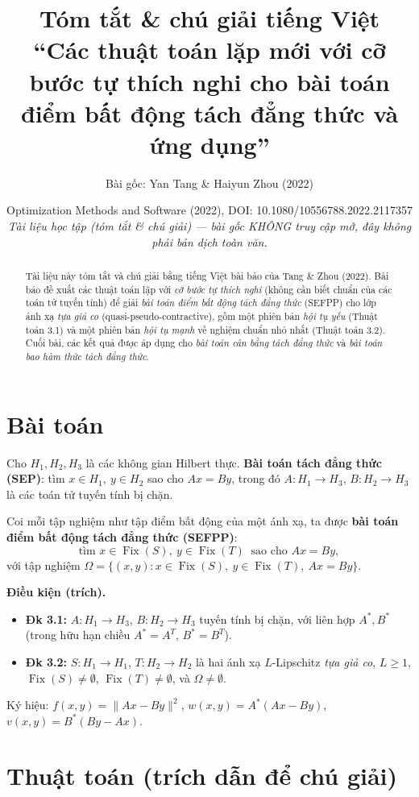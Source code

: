 \documentclass{MyBook}
\title{\vspace{-1.2cm}\bfseries Tóm tắt \& chú giải tiếng Việt\\[4pt]
\large ``Các thuật toán lặp mới với cỡ bước tự thích nghi cho bài toán điểm bất động tách đẳng thức và ứng dụng''}
\author{\normalsize Bài gốc: Yan Tang \& Haiyun Zhou (2022)}
\date{\small Optimization Methods and Software (2022), DOI: 10.1080/10556788.2022.2117357\\[2pt]
\textit{Tài liệu học tập (tóm tắt \& chú giải) --- bài gốc KHÔNG truy cập mở, đây không phải bản dịch toàn văn.}}
\theoremstyle{plain}
\theoremstyle{definition}
\newcommand{\nm}[1]{\lVert #1\rVert}
\newcommand{\Fix}{\operatorname{Fix}}
\begin{document}
\frontmatter
\maketitle

\begin{abstract}
\noindent Tài liệu này tóm tắt và chú giải bằng tiếng Việt bài báo của Tang \& Zhou (2022). Bài báo đề xuất các thuật toán lặp với \emph{cỡ bước tự thích nghi} (không cần biết chuẩn của các toán tử tuyến tính) để giải \emph{bài toán điểm bất động tách đẳng thức} (SEFPP) cho lớp ánh xạ \emph{tựa giả co} (quasi-pseudo-contractive), gồm một phiên bản \emph{hội tụ yếu} (Thuật toán 3.1) và một phiên bản \emph{hội tụ mạnh} về nghiệm chuẩn nhỏ nhất (Thuật toán 3.2). Cuối bài, các kết quả được áp dụng cho \emph{bài toán cân bằng tách đẳng thức} và \emph{bài toán bao hàm thức tách đẳng thức}.
\end{abstract}
\tableofcontents
\mainmatter

\chapter{Bài toán}

Cho $H_1,H_2,H_3$ là các không gian Hilbert thực. \textbf{Bài toán tách đẳng thức (SEP)}: tìm $x\in H_1,\ y\in H_2$ sao cho $Ax=By$, trong đó $A:H_1\to H_3$, $B:H_2\to H_3$ là các toán tử tuyến tính bị chặn.

Coi mỗi tập nghiệm như tập điểm bất động của một ánh xạ, ta được \textbf{bài toán điểm bất động tách đẳng thức (SEFPP)}:
\[
\text{tìm } x\in\Fix(S),\ y\in\Fix(T)\ \text{ sao cho } Ax=By, \tag{6}
\]
với tập nghiệm $\Omega=\{(x,y):x\in\Fix(S),\ y\in\Fix(T),\ Ax=By\}$.

\medskip
\noindent\textbf{Điều kiện (trích).}
\begin{itemize}[leftmargin=1.4em,itemsep=1pt]
\item \textbf{Đk 3.1:} $A:H_1\to H_3$, $B:H_2\to H_3$ tuyến tính bị chặn, với liên hợp $A^{*},B^{*}$ (trong hữu hạn chiều $A^{*}=A^{T}$, $B^{*}=B^{T}$).
\item \textbf{Đk 3.2:} $S:H_1\to H_1$, $T:H_2\to H_2$ là hai ánh xạ $L$-Lipschitz \emph{tựa giả co}, $L\ge 1$, $\Fix(S)\ne\emptyset$, $\Fix(T)\ne\emptyset$, và $\Omega\ne\emptyset$.
\end{itemize}
\noindent Ký hiệu: $f(x,y)=\nm{Ax-By}^2$, $w(x,y)=A^{*}(Ax-By)$, $v(x,y)=B^{*}(By-Ax)$.

\chapter{Thuật toán (trích dẫn để chú giải)}
\end{document}
